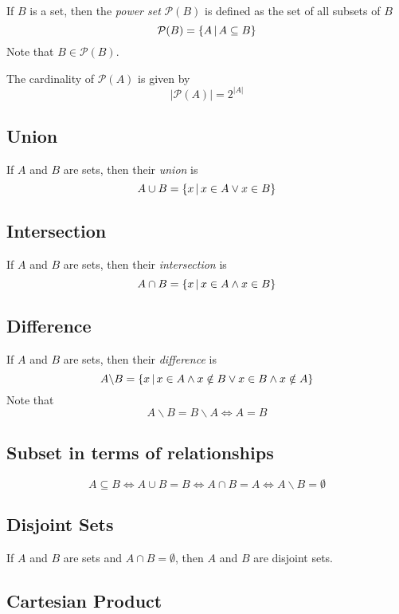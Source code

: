 \documentclass{article}
\begin{document}
If \(B\) is a set, then the \textit{power set} \(\mathcal{P}(B)\)
is defined as the set of all subsets of \(B\)
\[
    \mathcal{P}(B)=\{A \,|\, A\subseteq B\}
\]
Note that \(B\in\mathcal{P}(B)\).

The cardinality of \(\mathcal{P}(A)\) is given by
\[
    |\mathcal{P}(A)| = 2^{|A|}
\]

\subsection{Union}

If \(A\) and \(B\) are sets, then their \textit{union} is
\[
    A \cup B = \{x \,|\, x \in A \lor x \in B\}
\]

\subsection{Intersection}

If \(A\) and \(B\) are sets, then their \textit{intersection} is
\[
    A \cap B = \{x \,|\, x \in A \land x \in B\}
\]

\subsection{Difference}

If \(A\) and \(B\) are sets, then their \textit{difference} is
\[
    A \backslash B = \{x \,|\, x \in A \land x \notin B \lor x \in B \land x \notin A\}
\]
Note that
\[
    A \backslash B = B \backslash A
    \iff A = B
\]

\subsection{Subset in terms of relationships}

\[
    A \subseteq B
    \iff
    A \cup B = B
    \iff
    A \cap B = A
    \iff
    A \backslash B = \emptyset
\]

\subsection{Disjoint Sets}

If \(A\) and \(B\) are sets and \(A \cap B = \emptyset \), then \(A\)
and \(B\) are disjoint sets.

\subsection{Cartesian Product}
\end{document}
